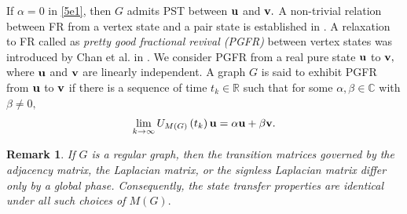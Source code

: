 \documentclass[12pt,a4paper]{article}
\newtheorem{rem}{Remark}
\def \e {{\bf e}}
\def \u {{\bf u}}
\def \v {{\bf v}}
\def \e {{\mathbf e}}
\newcommand{\ob}[1]{\left(#1\right)}
\begin{document}
If $\alpha=0$ in \eqref{5e1}, then $G$ admits PST between $\u$ and $\v.$  A non-trivial relation between FR from a vertex state and a pair state is established in \cite{pal10}.
A relaxation to FR called as \textit{pretty good fractional revival (PGFR)} between vertex states was introduced by Chan et al. in \cite{cha3}. 
  We consider PGFR from a real pure state $\u$ to $\v,$ where $\u$ and $\v$ are linearly independent.
   A graph $G$ is said to exhibit PGFR from $\u$ to $\v$ if there is a sequence of time $t_k\in\mathbb{R}$ such that for some $\alpha,\beta\in\mathbb{C}$ with $\beta\neq 0,$
   \[
       \lim_{k \to \infty}U_{M(G)}\ob{t_k}\u=\alpha\u+\beta\v.
  \]

 



\begin{rem}\label{5r1}
    If $G$ is a regular graph, then the transition matrices governed by the adjacency matrix, the Laplacian matrix, or the signless Laplacian matrix differ only by a global phase. Consequently, the state transfer
properties are identical under all such choices of $M(G).$ 
\end{rem}

   

\end{document}
